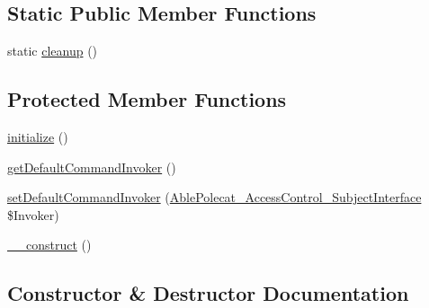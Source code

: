 \subsection*{Static Public Member Functions}
\begin{DoxyCompactItemize}
\item 
static \hyperlink{class_able_polecat___cache_object_abstract_ac4dd0cb38112e22ce4a62fbcd8cbc467}{cleanup} ()
\end{DoxyCompactItemize}
\subsection*{Protected Member Functions}
\begin{DoxyCompactItemize}
\item 
\hyperlink{class_able_polecat___cache_object_abstract_a91098fa7d1917ce4833f284bbef12627}{initialize} ()
\item 
\hyperlink{class_able_polecat___cache_object_abstract_a60be366090fa500d8062c7dfc40bfaf6}{get\+Default\+Command\+Invoker} ()
\item 
\hyperlink{class_able_polecat___cache_object_abstract_a8af7037413ce56303d66df3b83c9f6d3}{set\+Default\+Command\+Invoker} (\hyperlink{interface_able_polecat___access_control___subject_interface}{Able\+Polecat\+\_\+\+Access\+Control\+\_\+\+Subject\+Interface} \$Invoker)
\item 
\hyperlink{class_able_polecat___cache_object_abstract_a095c5d389db211932136b53f25f39685}{\+\_\+\+\_\+construct} ()
\end{DoxyCompactItemize}


\subsection{Constructor \& Destructor Documentation}
\hypertarget{class_able_polecat___cache_object_abstract_a095c5d389db211932136b53f25f39685}{}
